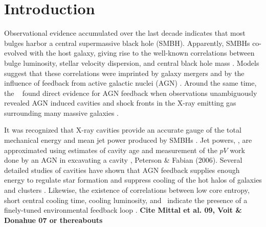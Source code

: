 \documentclass{emulateapj}
\begin{document}


\section{Introduction}
\label{sec:intro}

Observational evidence accumulated over the last decade indicates that
most bulges harbor a central supermassive black hole (SMBH).  Apparently,
SMBHs co-evolved with the host galaxy, giving rise to the well-known
correlations between bulge luminosity, stellar velocity dispersion,
and central black hole mass \citep{1995ARA&A..33..581K, magorrian,
  2000ApJ...539L...9F, 2000ApJ...539L..13G, marconihunt03,
  2005MNRAS.362...25B}.  Models suggest that these 
correlations were imprinted by galaxy mergers and by the influence
of feedback from active galactic nuclei (AGN)
\citep[\eg][]{1998A&A...331L...1S, 2000MNRAS.311..576K}. Around the
same time, the \cxo\ \citep{chandra} found direct evidence for AGN
feedback when observations unambiguously revealed AGN induced cavities
and shock fronts in the X-ray emitting gas surrounding many massive
galaxies \citep[\eg][]{2000ApJ...534L.135M, perseus1, schindler01}.

It was recognized that X-ray cavities provide an accurate gauge of the
total mechanical energy and mean jet power produced by SMBHs
\citep{2000ApJ...534L.135M}. Jet powers, \pjet, are approximated using
estimates of cavity age and measurement of the $pV$ work done by an
AGN in excavating a cavity \citep[see][for a
  reviews]{mcnamrev}, Peterson \& Fabian (2006). Several detailed studies of cavities have shown
that AGN feedback supplies enough energy to regulate star formation
and suppress cooling of the hot halos of galaxies and clusters
\citep{birzan04, 2005MNRAS.364.1343D, rafferty06, dunn08,
  birzan08, Diehl et al. 2008}. Likewise, the existence of correlations between low core
entropy, short central cooling time, cooling luminosity, and
\pjet\ indicate the presence of a finely-tuned environmental feedback loop \citep{haradent, 2008ApJ...687..899R,
  accept}. {\bf Cite Mittal et al. 09, Voit \& Donahue 07 or thereabouts}
\end{document}
